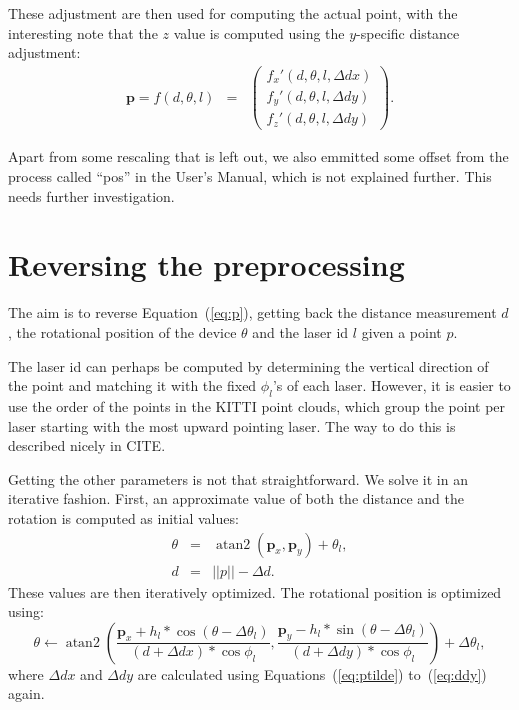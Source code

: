 \documentclass[english]{article}
\DeclareMathOperator*{\atantwo}{atan2}
\begin{document}
These adjustment are then used for computing the actual point, with the
interesting note that the $z$ value is computed using the $y$-specific
distance adjustment:
\begin{eqnarray}
  \mathbf{p} =
  f(d, \theta, l) &=& \left(
           \begin{array}{l}
              f_x'(d, \theta, l, \Delta dx) \\
              f_y'(d, \theta, l, \Delta dy) \\
              f_z'(d, \theta, l, \Delta dy)
           \end{array}
         \right).
  \label{eq:p}
\end{eqnarray}

Apart from some rescaling that is left out, we also emmitted some offset
from the process called ``pos'' in the User's Manual, which is not
explained further. This needs further investigation.


\section{Reversing the preprocessing}
The aim is to reverse Equation~(\ref{eq:p}), getting back the distance
measurement $d$, the rotational position of the device $\theta$ and the
laser id $l$ given a point $p$.

The laser id can perhaps be computed by determining the vertical
direction of the point and matching it with the fixed $\phi_l$'s of each
laser. However, it is easier to use the order of the points in the KITTI
point clouds, which group the point per laser starting with the most
upward pointing laser. The way to do this is described nicely in CITE.

Getting the other parameters is not that straightforward. We solve it in
an iterative fashion. First, an approximate value of both the distance and
the rotation is computed as initial values:
\begin{eqnarray}
  \theta &=& \atantwo(\mathbf{p}_x, \mathbf{p}_y) + \theta_l, \\
  d &=& ||p|| - \Delta d.
\end{eqnarray}
These values are then iteratively optimized. The rotational position is optimized using:
\begin{equation}
   \theta \leftarrow \atantwo\left(
                     \frac{\mathbf{p}_x + h_l * \cos(\theta - \Delta \theta_l)}{(d + \Delta dx) * \cos{\phi_l}},
                     \frac{\mathbf{p}_y - h_l * \sin(\theta - \Delta \theta_l)}{(d + \Delta dy) * \cos{\phi_l}}
           \right) + \Delta \theta_l,
   \label{eq:thetait}
\end{equation}
where $\Delta dx$ and $\Delta dy$ are calculated using
Equations~(\ref{eq:ptilde}) to~(\ref{eq:ddy}) again.
\end{document}

